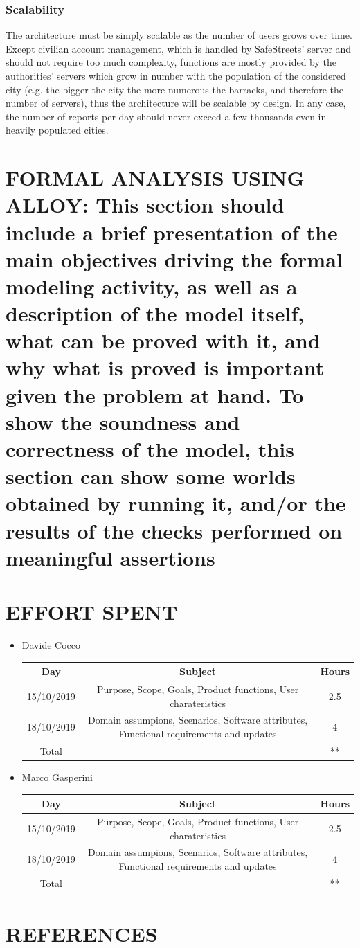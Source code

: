 \documentclass[12pt,a4paper]{article}
\begin{document}
\subsubsection{Scalability}
The architecture must be simply scalable as the number of users grows over time. Except civilian account management, which is handled by SafeStreets' server and should not require too much complexity, functions are mostly provided by the authorities' servers which grow in number with the population of the considered city (e.g. the bigger the city the more numerous the barracks, and therefore the number of servers), thus the architecture will be scalable by design. In any case, the number of reports per day should never exceed a few thousands even in heavily populated cities.
\section{FORMAL	ANALYSIS	USING	ALLOY: This	section	should include	a	brief	presentation	of the	
main	objectives	driving	the	formal	modeling	activity, as	well	as	a	description	of the	model	
itself,	what	can	be	proved with	it, and	why	what	is	proved is	important	given	the	problem	at	
hand. To	show	 the	soundness	and	correctness	of	the model,	 this	section	can	show	some
worlds	obtained	by	running	it,	and/or	the	results	of	the	checks	performed	on	meaningful	
assertions}
\section{EFFORT	SPENT}
\begin{itemize}
\item {Davide Cocco}
 \begin{center}
			\begin{tabular}{| c | c | c |}
				\hline
				Day & Subject & Hours \\ \hline
				15/10/2019 & Purpose, Scope, Goals, Product functions, User charateristics & 2.5 \\
				18/10/2019 & Domain assumpions, Scenarios, Software attributes, Functional requirements and updates  & 4\\
				\hline
				Total & & ** \\
				\hline
			\end{tabular}
		\end{center}
\item {Marco Gasperini}
\begin{center}
			\begin{tabular}{| c | c | c |}
				\hline
				Day & Subject & Hours \\ \hline
				15/10/2019 & Purpose, Scope, Goals, Product functions, User charateristics & 2.5 \\
				18/10/2019 & Domain assumpions, Scenarios, Software attributes, Functional requirements and updates  & 4\\
				\hline
				Total & & ** \\
				\hline
			\end{tabular}
\end{center}
\end{itemize}
\section{REFERENCES}
\end{document}
